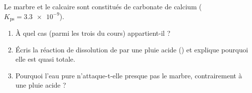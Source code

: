 \documentclass[11pt,a4paper]{article}
\begin{document}
\begin{exo}
Le marbre et le calcaire sont constitués de carbonate de calcium 
($K_{\mathrm{ps}}=\num{3.3e-9}$).
\begin{enumerate}[label=\alph*)]
  \item À quel cas (parmi les trois du cours)  appartient-il ?
  \item Écris la réaction de dissolution de  par une pluie acide () et explique
        pourquoi elle est quasi totale.
  \item Pourquoi l'eau pure n'attaque-t-elle presque pas le marbre, contrairement à une pluie acide ?
\end{enumerate}
\end{exo}
\end{document}
